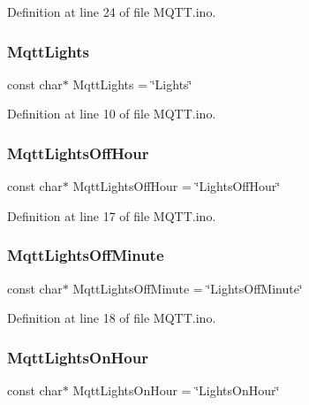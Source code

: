 Definition at line 24 of file M\+Q\+T\+T.\+ino.

\mbox{\label{_m_q_t_t_8ino_aeff9dab1d68d9d398f57cde7f917cce5}} 
\subsubsection{\texorpdfstring{MqttLights}{MqttLights}}
{\footnotesize\ttfamily const char$\ast$ Mqtt\+Lights = \char`\"{}Lights\char`\"{}}



Definition at line 10 of file M\+Q\+T\+T.\+ino.

\mbox{\label{_m_q_t_t_8ino_a357333d341895879b35e691ea3c907a8}} 
\subsubsection{\texorpdfstring{MqttLightsOffHour}{MqttLightsOffHour}}
{\footnotesize\ttfamily const char$\ast$ Mqtt\+Lights\+Off\+Hour = \char`\"{}Lights\+Off\+Hour\char`\"{}}



Definition at line 17 of file M\+Q\+T\+T.\+ino.

\mbox{\label{_m_q_t_t_8ino_a65bc5e01b994f39c867bfaadd9ce9ac4}} 
\subsubsection{\texorpdfstring{MqttLightsOffMinute}{MqttLightsOffMinute}}
{\footnotesize\ttfamily const char$\ast$ Mqtt\+Lights\+Off\+Minute = \char`\"{}Lights\+Off\+Minute\char`\"{}}



Definition at line 18 of file M\+Q\+T\+T.\+ino.

\mbox{\label{_m_q_t_t_8ino_aa6deb166c98557809a49dd9bdcb8b138}} 
\subsubsection{\texorpdfstring{MqttLightsOnHour}{MqttLightsOnHour}}
{\footnotesize\ttfamily const char$\ast$ Mqtt\+Lights\+On\+Hour = \char`\"{}Lights\+On\+Hour\char`\"{}}



